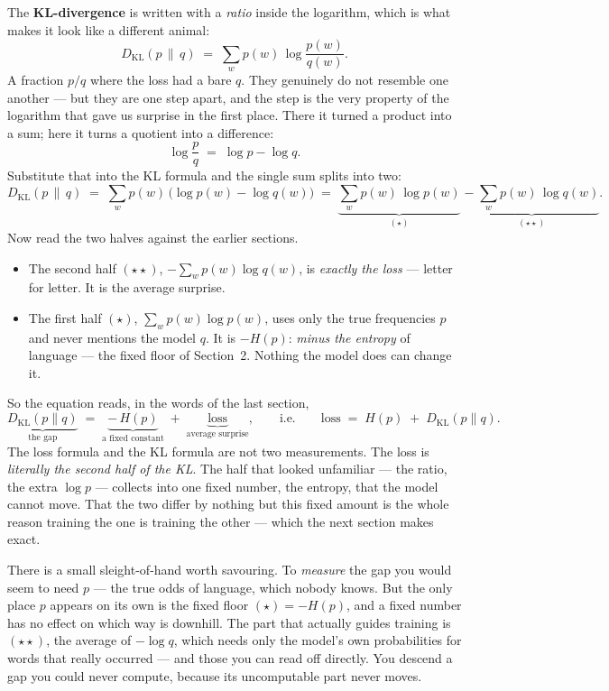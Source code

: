 \documentclass[11pt]{article}
\begin{document}
The \textbf{KL-divergence} is written with a \emph{ratio} inside the logarithm, which is what
makes it look like a different animal:
\[
  D_{\mathrm{KL}}(p \,\|\, q) \;=\; \sum_w p(w)\,\log\frac{p(w)}{q(w)}.
\]
A fraction $p/q$ where the loss had a bare $q$. They genuinely do not resemble one another --- but
they are one step apart, and the step is the very property of the logarithm that gave us surprise
in the first place. There it turned a product into a sum; here it turns a quotient into a
difference:
\[
  \log\frac{p}{q} \;=\; \log p - \log q.
\]
Substitute that into the KL formula and the single sum splits into two:
\[
  D_{\mathrm{KL}}(p \,\|\, q)
    \;=\; \sum_w p(w)\,\bigl(\log p(w) - \log q(w)\bigr)
    \;=\; \underbrace{\sum_w p(w)\,\log p(w)}_{(\star)}
      \;\underbrace{-\;\sum_w p(w)\,\log q(w)}_{(\star\star)}.
\]
Now read the two halves against the earlier sections.
\begin{itemize}[leftmargin=1.4em]
  \item The second half $(\star\star)$, $-\sum_w p(w)\log q(w)$, is \emph{exactly the loss} ---
  letter for letter. It is the average surprise.
  \item The first half $(\star)$, $\sum_w p(w)\log p(w)$, uses only the true frequencies $p$ and
  never mentions the model $q$. It is $-H(p)$: \emph{minus the entropy} of language --- the fixed
  floor of Section~2. Nothing the model does can change it.
\end{itemize}
So the equation reads, in the words of the last section,
\[
  \underbrace{D_{\mathrm{KL}}(p\|q)}_{\text{the gap}}
    \;=\; \underbrace{-\,H(p)}_{\text{a fixed constant}}
      \;+\; \underbrace{\text{loss}}_{\text{average surprise}},
  \qquad\text{i.e.}\qquad
  \text{loss} \;=\; H(p) \;+\; D_{\mathrm{KL}}(p\|q).
\]
The loss formula and the KL formula are not two measurements. The loss is \emph{literally the
second half of the KL}. The half that looked unfamiliar --- the ratio, the extra $\log p$ ---
collects into one fixed number, the entropy, that the model cannot move. That the two differ by
nothing but this fixed amount is the whole reason training the one is training the other --- which
the next section makes exact.

\begin{insight}
There is a small sleight-of-hand worth savouring. To \emph{measure} the gap you would seem to
need $p$ --- the true odds of language, which nobody knows. But the only place $p$ appears on its
own is the fixed floor $(\star) = -H(p)$, and a fixed number has no effect on which way is
downhill. The part that actually guides training is $(\star\star)$, the average of $-\log q$,
which needs only the model's own probabilities for words that really occurred --- and those you
can read off directly. You descend a gap you could never compute, because its uncomputable part
never moves.
\end{insight}
\end{document}
